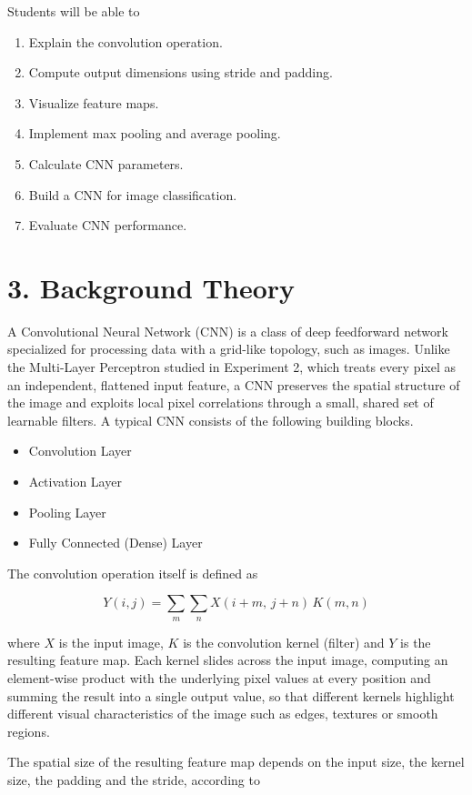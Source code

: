 \documentclass[11pt,a4paper]{article}
\begin{document}
Students will be able to

\begin{enumerate}
\item Explain the convolution operation.
\item Compute output dimensions using stride and padding.
\item Visualize feature maps.
\item Implement max pooling and average pooling.
\item Calculate CNN parameters.
\item Build a CNN for image classification.
\item Evaluate CNN performance.
\end{enumerate}

\section*{3. Background Theory}

A Convolutional Neural Network (CNN) is a class of deep feedforward network specialized for processing data with a grid-like topology, such as images. Unlike the Multi-Layer Perceptron studied in Experiment 2, which treats every pixel as an independent, flattened input feature, a CNN preserves the spatial structure of the image and exploits local pixel correlations through a small, shared set of learnable filters. A typical CNN consists of the following building blocks.

\begin{itemize}
\item Convolution Layer
\item Activation Layer
\item Pooling Layer
\item Fully Connected (Dense) Layer
\end{itemize}

The convolution operation itself is defined as

\[
Y(i,j) = \sum_{m}\sum_{n} X(i+m,\,j+n)\,K(m,n)
\]

where $X$ is the input image, $K$ is the convolution kernel (filter) and $Y$ is the resulting feature map. Each kernel slides across the input image, computing an element-wise product with the underlying pixel values at every position and summing the result into a single output value, so that different kernels highlight different visual characteristics of the image such as edges, textures or smooth regions.

The spatial size of the resulting feature map depends on the input size, the kernel size, the padding and the stride, according to
\end{document}

